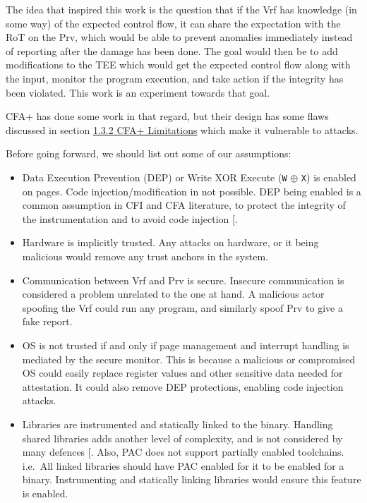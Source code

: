 \documentclass[a4paper, nobind]{templates/ociamthesis}
\providecommand{\tightlist}{%
  \setlength{\itemsep}{0pt}\setlength{\parskip}{0pt}}
\begin{document}
The idea that inspired this work is the question that if the Vrf has knowledge (in some way)
of the expected control ﬂow, it can share the expectation with the RoT on the Prv,
which would be able to prevent anomalies immediately instead of reporting after
the damage has been done. The goal would then be to add modiﬁcations to the TEE
which would get the expected control ﬂow along with the input, monitor the program
execution, and take action if the integrity has been violated.
This work is an experiment towards that goal.

CFA+ has done some work in that regard, but their design has some flaws discussed in
section \hyperref[cfaplus-limitations]{1.3.2 CFA+ Limitations} which make it vulnerable to attacks.

Before going forward, we should list out some of our assumptions:

\begin{itemize}
\tightlist
\item
  Data Execution Prevention (DEP) or Write XOR Execute (\texttt{W} \(\oplus\) \texttt{X}) is enabled
  on pages. Code injection/modification in not possible.
  DEP being enabled is a common assumption in CFI and CFA literature, to protect
  the integrity of the instrumentation and to avoid code injection {[}\citeproc{ref-sok}{5}{]}.
\item
  Hardware is implicitly trusted. Any attacks on hardware, or it being malicious
  would remove any trust anchors in the system.
\item
  Communication between Vrf and Prv is secure. Insecure communication is considered
  a problem unrelated to the one at hand. A malicious actor spoofing the Vrf could
  run any program, and similarly spoof Prv to give a fake report.
\item
  OS is not trusted if and only if page management and interrupt handling is mediated
  by the secure monitor. This is because a malicious or compromised OS could easily
  replace register values and other sensitive data needed for attestation. It could also
  remove DEP protections, enabling code injection attacks.
\item
  Libraries are instrumented and statically linked to the binary. Handling shared
  libraries adds another level of complexity, and is not considered by many defences
  {[}\citeproc{ref-cfaplus}{4}{]}. Also, PAC does not support partially enabled toolchains. i.e.~All
  linked libraries should have PAC enabled for it to be enabled for a binary.
  Instrumenting and statically linking libraries would ensure this feature is enabled.
\end{itemize}
\end{document}

